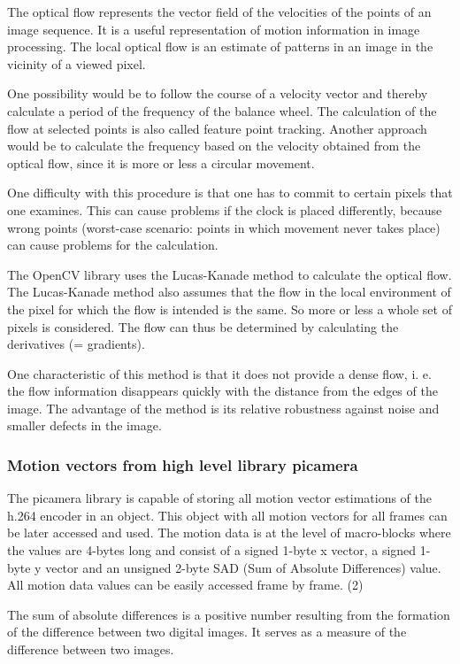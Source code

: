 \documentclass[12pt, a4paper]{report}
\begin{document}
The optical flow represents the vector field of the velocities of the points of an image sequence. It is a useful representation of motion information in image processing. The local optical flow is an estimate of patterns in an image in the vicinity of a viewed pixel. 

One possibility would be to follow the course of a velocity vector and thereby calculate a period of the frequency of the balance wheel. The calculation of the flow at selected points is also called feature point tracking. Another approach would be to calculate the frequency based on the velocity obtained from the optical flow, since it is more or less a circular movement. 

One difficulty with this procedure is that one has to commit to certain pixels that one examines. This can cause problems if the clock is placed differently, because wrong points (worst-case scenario: points in which movement never takes place) can cause problems for the calculation.  

The OpenCV library uses the Lucas-Kanade method to calculate the optical flow. The Lucas-Kanade method also assumes that the flow in the local environment of the pixel for which the flow is intended is the same. So more or less a whole set of pixels is considered. The flow can thus be determined by calculating the derivatives (= gradients). 

One characteristic of this method is that it does not provide a dense flow, i. e. the flow information disappears quickly with the distance from the edges of the image. The advantage of the method is its relative robustness against noise and smaller defects in the image.

\subsubsection{Motion vectors from high level library picamera}
The picamera library is capable of storing all motion vector estimations of the h.264 encoder in an object. This object with all motion vectors for all frames can be later accessed and used. The motion data is at the level of macro-blocks where the values are 4-bytes long and consist of a signed 1-byte x vector, a signed 1-byte y vector and an unsigned 2-byte SAD (Sum of Absolute Differences) value. All motion data values can be easily accessed frame by frame. (2) 

The sum of absolute differences is a positive number resulting from the formation of the difference between two digital images. It serves as a measure of the difference between two images.
\end{document}
